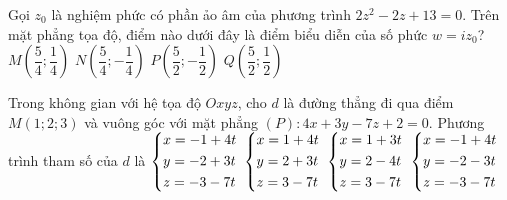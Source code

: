 \begin{ex}%
	Gọi $z_0$ là nghiệm phức có phần ảo âm của phương trình $2z^2 - 2z + 13=0$. Trên mặt phẳng tọa độ, điểm nào dưới đây là điểm biểu diễn của số phức $w=iz_0$?
	\choice
	{$M\left(\dfrac{5}{4}; \dfrac{1}{4}\right)$}
	{$N\left(\dfrac{5}{4}; - \dfrac{1}{4}\right)$}
	{$P\left(\dfrac{5}{2}; - \dfrac{1}{2}\right)$}
	{\True $Q\left(\dfrac{5}{2}; \dfrac{1}{2}\right)$}
\end{ex}

\begin{ex}%
	Trong không gian với hệ tọa độ $Oxyz$, cho $d$ là đường thẳng đi qua điểm $M\left(1; 2; 3\right)$ và vuông góc với mặt phẳng $(P)\colon 4x + 3y - 7z + 2=0$. Phương trình tham số của $d$ là 
	\choice
	{$\left\{\begin{aligned} & x= - 1 + 4t \\ & y= - 2 + 3t \\ & z= - 3 - 7t \end{aligned}\right. $}
	{\True $\left\{\begin{aligned} & x=1 + 4t \\ & y=2 + 3t \\ & z=3 - 7t \end{aligned}\right. $}
	{$\left\{\begin{aligned} & x=1 + 3t \\ & y=2 - 4t \\ 
		& z=3 - 7t \end{aligned}\right. $}
	{$\left\{\begin{aligned} & x= - 1 + 4t \\ & y= - 2 - 3t \\ & z= - 3 - 7t \end{aligned}\right. $}
\end{ex}


